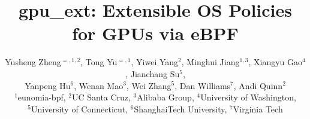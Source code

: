 \documentclass[letterpaper,twocolumn,10pt]{article}
\newcommand{\sys}{gpu\_ext\xspace}
\begin{document}
\pagestyle{plain}

\date{}


\title{\sys: Extensible OS Policies for GPUs via eBPF}


\author{
{\rm Yusheng Zheng}$^{=,1,2}$,
{\rm Tong Yu}$^{=,1}$,
{\rm Yiwei Yang}$^{2}$,
{\rm Minghui Jiang}$^{1,3}$,
{\rm Xiangyu Gao}$^{4}$,
{\rm Jianchang Su}$^{5}$,\\
{\rm Yanpeng Hu}$^{6}$,
{\rm Wenan Mao}$^{3}$,
{\rm Wei Zhang}$^{5}$,
{\rm Dan Williams}$^{7}$,
{\rm Andi Quinn}$^{2}$\\[1ex]
$^{1}$eunomia-bpf,
$^{2}$UC Santa Cruz,
$^{3}$Alibaba Group,
$^{4}$University of Washington,\\
$^{5}$University of Connecticut,
$^{6}$ShanghaiTech University,
$^{7}$Virginia Tech
}

\maketitle
\let\thefootnote\relax{}



% 


% 







\end{document}
